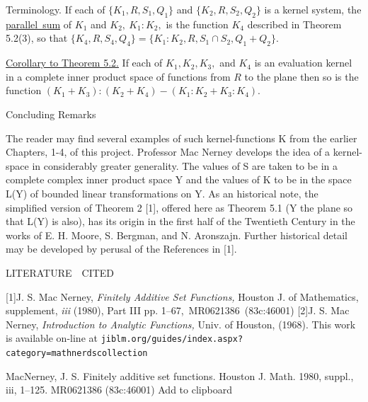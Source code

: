Terminology. If each of $\{K_{1},R,S_{1},Q_{1}\}$ and $\{K_{2},R,S_{2},Q_{2}\}$ is a kernel system, the \underline{parallel~sum} of $K_{1}$ and $K_{2},~K_{1}:K_{2},$ is the function $K_{4}$ described in Theorem 5.2(3), so that $\{K_{4},R,S_{4},Q_{4}\} = \{K_{1}:K_{2},R,S_{1}\cap S_{2},Q_{1}+Q_{2}   \}.$\nl

\underline{Corollary to Theorem 5.2.}  If each of $K_{1}, K_{2}, K_{3},$ and $K_{4}$ is an evaluation kernel in a complete inner product space of functions from $R$ to the plane then so is the function
$(K_{1} + K_{3}):(K_{2} + K_{4}) - (K_{1}:K_{2} + K_{3}:K_{4}).$\nl

\begin{large}
\begin{center}
Concluding Remarks
\end{center}
\end{large}

The reader may find several examples of such kernel-functions K
from the earlier Chapters, 1-4, of this project.  Professor Mac Nerney develops
the idea of a kernel-space in considerably greater generality.  The values of S are
taken to be in a complete complex inner product space Y and the values of K to be
in the space L(Y) of bounded linear transformations on Y.  As an historical note,
 the simplified version of Theorem 2 [1],  offered here  as Theorem 5.1
(Y the plane so that L(Y) is also), has its origin in the first half of the
Twentieth Century in the works of E. H. Moore, S. Bergman, and N. Aronszajn.
Further historical detail may be developed by perusal of the References in [1].



\begin{large}
\begin{center}
LITERATURE~~CITED
\end{center}
\end{large}
[1]\qquad J. S. Mac Nerney,
\textit{Finitely Additive Set Functions,}
Houston J. of Mathematics, supplement, \textit{iii} (1980), Part III pp. 1--67,~MR0621386~(83c:46001)\nl
[2]\qquad J. S. Mac Nerney,
\textit{Introduction to Analytic Functions,}
Univ. of Houston, (1968).  This work is available on-line at\nl
\texttt{jiblm.org/guides/index.aspx?category=mathnerdscollection}





MacNerney, J. S. Finitely additive set functions. Houston J. Math. 1980, suppl., iii, 1--125. MR0621386 (83c:46001) Add to clipboard 